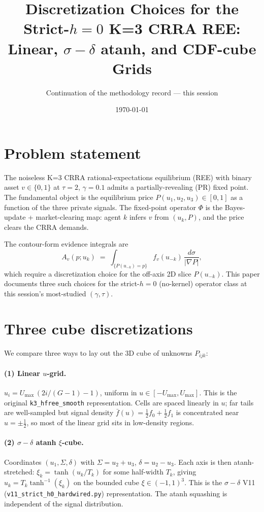 \documentclass[11pt]{article}
\title{\textbf{Discretization Choices for the Strict-$h{=}0$ K=3 CRRA REE:\\
Linear, $\sigma{-}\delta$ atanh, and CDF-cube Grids}}
\author{Continuation of the methodology record --- this session}
\date{\today}
\begin{document}
\maketitle
\tableofcontents

\section{Problem statement}

The noiseless K=3 CRRA rational-expectations equilibrium (REE) with binary asset
$v\in\{0,1\}$ at $\tau=2$, $\gamma=0.1$ admits a partially-revealing (PR) fixed
point. The fundamental object is the equilibrium price $P(u_1,u_2,u_3)\in[0,1]$
as a function of the three private signals. The fixed-point operator $\Phi$ is
the Bayes-update + market-clearing map: agent $k$ infers $v$ from
$(u_k, P)$, and the price clears the CRRA demands.

The contour-form evidence integrals are
\[
A_v(p; u_k) \;=\; \int_{\{P(u_{-k})=p\}} f_v(u_{-k})\,\frac{d\sigma}{|\nabla P|},
\]
which require a discretization choice for the off-axis 2D slice $P(u_{-k})$.
This paper documents three such choices for the strict-$h{=}0$ (no-kernel)
operator class at this session's most-studied $(\gamma,\tau)$.

\section{Three cube discretizations}
\label{sec:grids}

We compare three ways to lay out the 3D cube of unknowns $P_{ijk}$:

\paragraph{(1) Linear $u$-grid.} $u_i = U_\mathrm{max}\,(2i/(G{-}1)-1)$, uniform
in $u\in[-U_\mathrm{max}, U_\mathrm{max}]$. This is the original
\texttt{k3\_hfree\_smooth} representation. Cells are
spaced linearly in $u$; far tails are well-sampled but signal density
$\bar f(u)=\tfrac12 f_0+\tfrac12 f_1$ is concentrated near $u=\pm\tfrac12$, so
most of the linear grid sits in low-density regions.

\paragraph{(2) $\sigma{-}\delta$ atanh $\xi$-cube.}
Coordinates $(u_1,\Sigma,\delta)$ with $\Sigma=u_2+u_3$, $\delta=u_2-u_3$. Each
axis is then atanh-stretched: $\xi_k=\tanh(u_k/T_k)$ for some half-width $T_k$,
giving $u_k=T_k\tanh^{-1}(\xi_k)$ on the bounded cube $\xi\in(-1,1)^3$. This is
the $\sigma{-}\delta$ V11 (\texttt{v11\_strict\_h0\_hardwired.py}) representation.
The atanh squashing is independent of the signal distribution.
\end{document}
